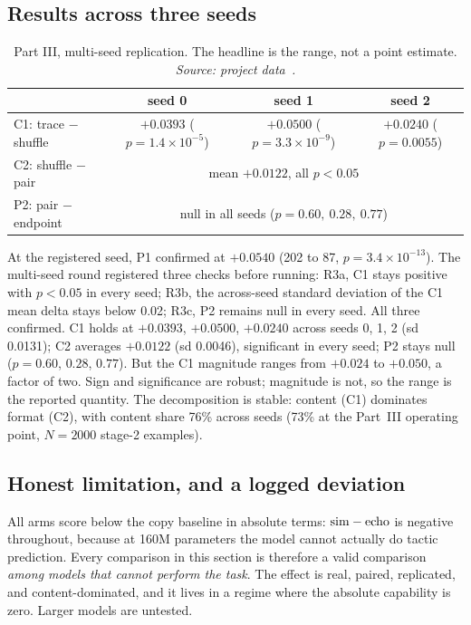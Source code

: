 \subsection{Results across three seeds}

\begin{table}[htbp]
\centering\footnotesize
\caption{Part III, multi-seed replication. The headline is the range, not a point estimate. \emph{Source: project data~\cite{appliedrepo2026}.}}
\label{tab:part3}
\begin{tabular}{lccc}
\toprule
 & seed 0 & seed 1 & seed 2 \\
\midrule
C1: trace $-$ shuffle & $+0.0393$ ($p = 1.4\!\times\!10^{-5}$) & $+0.0500$ ($p = 3.3\!\times\!10^{-9}$) & $+0.0240$ ($p = 0.0055$) \\
C2: shuffle $-$ pair & \multicolumn{3}{c}{mean $+0.0122$, all $p < 0.05$} \\
P2: pair $-$ endpoint & \multicolumn{3}{c}{null in all seeds ($p = 0.60,\ 0.28,\ 0.77$)} \\
\bottomrule
\end{tabular}
\end{table}

At the registered seed, P1 confirmed at $+0.0540$ (202 to 87, $p = 3.4\times10^{-13}$). The multi-seed round registered three checks before running: R3a, C1 stays positive with $p < 0.05$ in every seed; R3b, the across-seed standard deviation of the C1 mean delta stays below 0.02; R3c, P2 remains null in every seed. All three confirmed. C1 holds at $+0.0393$, $+0.0500$, $+0.0240$ across seeds 0, 1, 2 (sd 0.0131); C2 averages $+0.0122$ (sd 0.0046), significant in every seed; P2 stays null ($p = 0.60$, $0.28$, $0.77$). But the C1 magnitude ranges from $+0.024$ to $+0.050$, a factor of two. Sign and significance are robust; magnitude is not, so the range is the reported quantity. The decomposition is stable: content (C1) dominates format (C2), with content share 76\% across seeds (73\% at the Part~III operating point, $N = 2000$ stage-2 examples).

\subsection{Honest limitation, and a logged deviation}

All arms score below the copy baseline in absolute terms: $\mathrm{sim}-\mathrm{echo}$ is negative throughout, because at 160M parameters the model cannot actually do tactic prediction. Every comparison in this section is therefore a valid comparison \emph{among models that cannot perform the task}. The effect is real, paired, replicated, and content-dominated, and it lives in a regime where the absolute capability is zero. Larger models are untested.

